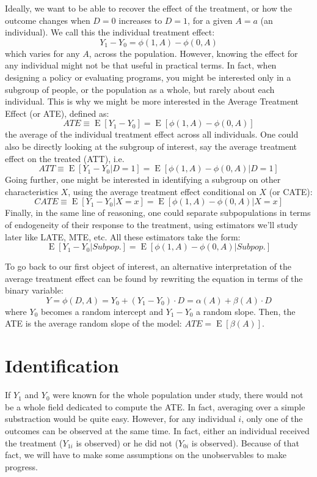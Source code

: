 \documentclass[12pt]{report}
\newcommand{\E}[1]{\operatorname{E}\left[#1\right]}
\begin{document}
Ideally, we want to be able to recover the effect of the treatment, or how the outcome changes when $D=0$ increases to $D=1$, for a given $A = a$ (an individual). We call this the individual treatment effect: $$Y_1 - Y_0 = \phi(1, A) - \phi(0, A) $$ which varies for any $A$, across the population. However, knowing the effect for any individual might not be that useful in practical terms. In fact, when designing a policy or evaluating programs, you might be interested only in a subgroup of people, or the population as a whole, but rarely about each individual. This is why we might be more interested in the Average Treatment Effect (or ATE), defined as: $$ATE \equiv \E{Y_1 - Y_0} = \E{\phi(1, A) - \phi(0, A)} $$ the average of the individual treatment effect across all individuals. One could also be directly looking at the subgroup of interest, say the average treatment effect on the treated (ATT), i.e. $$ ATT \equiv \E{Y_1 - Y_0\vert D = 1} = \E{\phi(1, A) - \phi(0, A)\vert D=1} $$ Going further, one might be interested in identifying a subgroup on other characteristics $X$, using the average treatment effect conditional on $X$ (or CATE): $$CATE \equiv \E{Y_1 - Y_0\vert X = x} = \E{\phi(1, A) - \phi(0, A)\vert X=x} $$ Finally, in the same line of reasoning, one could separate subpopulations in terms of endogeneity of their response to the treatment, using estimators we'll study later like LATE, MTE, etc. All these estimators take the form: $$ \E{Y_1 - Y_0\vert \textit{Subpop.}} = \E{\phi(1, A) - \phi(0, A)\vert \textit{Subpop.}} $$

To go back to our first object of interest, an alternative interpretation of the average treatment effect can be found by rewriting the equation in terms of the binary variable: $$Y = \phi(D, A) = Y_0 + (Y_1 - Y_0)\cdot D = \alpha(A) + \beta(A)\cdot D $$ where $Y_0$ becomes a random intercept and $Y_1 - Y_0$ a random slope. Then, the ATE is the average random slope of the model: $ATE = \E{\beta(A)}$.

\section{Identification}

If $Y_1$ and $Y_0$ were known for the whole population under study, there would not be a whole field dedicated to compute the ATE. In fact, averaging over a simple substraction would be quite easy. However, for any individual $i$, only one of the outcomes can be observed at the same time. In fact, either an individual received the treatment ($Y_{1i}$ is observed) or he did not ($Y_{0i}$ is observed). Because of that fact, we will have to make some assumptions on the unobservables to make progress.
\end{document}

